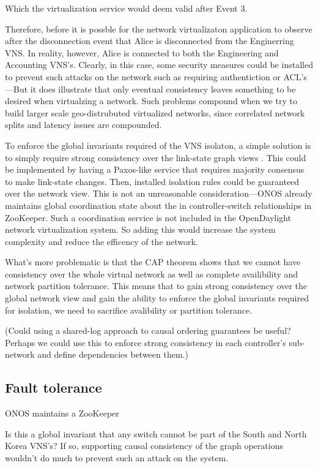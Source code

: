 \documentclass[letterpaper,twocolumn,10pt]{article}
\begin{document}
Which the virtualization service would deem valid after Event 3.

Therefore, before it is possble for the network virtualizaton application to observe after the disconnection event that Alice is disconnected from the Enginerring VNS. In reality, however, Alice is connected to both the Engineering and Accounting VNS's. Clearly, in this case, some security measures could be installed to prevent such attacks on the network such as requiring authentiction or ACL's---But it does illustrate that only eventual consistency leaves something to be desired when virtualzing a network. Such problems compound when we try to build larger scale geo-distrubuted virtualized networks, since correlated network splits and latency issues are compounded.

To enforce the global invariants required of the VNS isolaton, a simple solution is to simply require strong consistency over the link-state graph views \cite{bgp:rfc}. This could be implemented by having a Paxos-like service that requires majority consensus to make link-state changes. Then, installed isolation rules could be guaranteed over the network view. This is not an unreasonable consideration---ONOS already maintains global coordination state about the in
controller-switch relationships in ZooKeeper. Such a coordination service is not included in the OpenDaylight network virtualization system. So adding this would increase the system complexity and reduce the efficency of the network.

What's more problematic is that the CAP theorem \cite{brewer2000towards} shows that we cannot have consistency over the whole virtual network as well as complete availibility and network partition tolerance. This means that to gain strong consistency over the global network view and gain the ability to enforce the global invariants required for isolation, we need to sacrifice avalibility or partition tolerance.

(Could using a shared-log approach to causal ordering guarantees be useful? Perhaps we could use this to enforce strong consistency in each controller's sub-network and define dependencies between them.)

\subsection{Fault tolerance}

ONOS maintains a ZooKeeper 

 Is this a global invariant that any switch cannot be part of the South and North Korea VNS's? If so, supporting causal consistency of the graph operations wouldn't do much to prevent such an attack on the system. 
\end{document}
